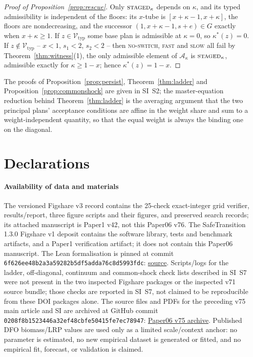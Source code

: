 \documentclass[preprint,11pt,authoryear]{elsarticle}
\theoremstyle{definition}
\theoremstyle{remark}
\newcommand{\Vtyp}{\mathcal{V}_{\mathrm{typ}}}
\newcommand{\act}[1]{\textsc{#1}}
\begin{document}
\begin{proof}[Proof of Proposition~\ref{prop:rescue}]
Only $\act{staged}_\kappa$ depends on $\kappa$, and its typed admissibility is independent of the floors: its $x$-tube is $[x+\kappa-1,x+\kappa]$, the floors are nondecreasing, and the successor $(1,x+\kappa-1,s+e)\in G$ exactly when $x+\kappa\ge1$. If $z\in\Vtyp$ some base plan is admissible at $\kappa=0$, so $\kappa^*(z)=0$. If $z\notin\Vtyp$ -- $x<1$, $s_1<2$, $s_2<2$ -- then \act{no-switch}, \act{fast} and \act{slow} all fail by Theorem~\ref{thm:witness}(1), the only admissible element of $\mathcal A_\kappa$ is $\act{staged}_\kappa$, admissible exactly for $\kappa\ge1-x$; hence $\kappa^*(z)=1-x$.
\end{proof}

\noindent The proofs of Proposition~\ref{prop:persist}, Theorem~\ref{thm:ladder} and Proposition~\ref{prop:commonshock} are given in SI~S2; the master-equation reduction behind Theorem~\ref{thm:ladder} is the averaging argument that the two principal plans' acceptance conditions are affine in the weight share and sum to a weight-independent quantity, so that the equal weight is always the binding one on the diagonal.

\section*{Declarations}
\paragraph{Availability of data and materials} The versioned Figshare v3 record \citep{Abaee2026code} contains the 25-check exact-integer grid verifier, results/report, three figure scripts and their figures, and preserved search records; its attached manuscript is Paper1 v42, not this Paper06 v76. The SafeTransition 1.3.0 Figshare v1 deposit \citep{Abaee2026software} contains the software library, tests and benchmark artifacts, and a Paper1 verification artifact; it does not contain this Paper06 manuscript. The Lean formalisation is pinned at commit \texttt{6f626ee48b2a3a59282b5df5adda76c8d5993fdc}: \href{https://github.com/MIKEAA2020/general-sustainability/blob/6f626ee48b2a3a59282b5df5adda76c8d5993fdc/lean/Formalizations/P1_AssessmentSeparation.lean}{source}. Scripts/logs for the ladder, off-diagonal, continuum and common-shock check lists described in SI~S7 were not present in the two inspected Figshare packages or the inspected v71 source bundle; those checks are reported in SI~S7, not claimed to be reproducible from these DOI packages alone. The source files and PDFs for the preceding v75 main article and SI are archived at GitHub commit \texttt{0208f8b1523446a32ef48cbfe50415fe7ec78947}: \href{https://github.com/MIKEAA2020/general-sustainability/tree/0208f8b1523446a32ef48cbfe50415fe7ec78947/companion_restorations_20261026/Paper06_v75}{Paper06 v75 archive}. Published DFO biomass/LRP values are used only as a limited scale/context anchor: no parameter is estimated, no new empirical dataset is generated or fitted, and no empirical fit, forecast, or validation is claimed.
\end{document}

